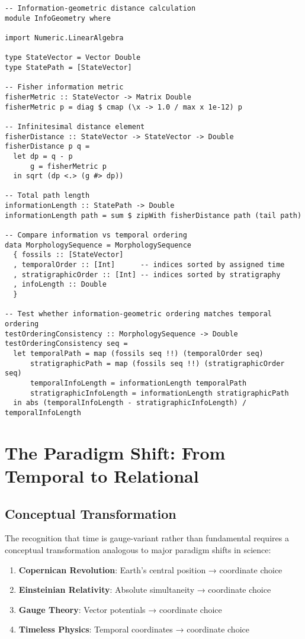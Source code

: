 \documentclass[11pt]{article}
\theoremstyle{definition}
\theoremstyle{plain}
\theoremstyle{remark}
\begin{document}
\begin{lstlisting}
-- Information-geometric distance calculation
module InfoGeometry where

import Numeric.LinearAlgebra

type StateVector = Vector Double
type StatePath = [StateVector]

-- Fisher information metric
fisherMetric :: StateVector -> Matrix Double  
fisherMetric p = diag $ cmap (\x -> 1.0 / max x 1e-12) p

-- Infinitesimal distance element
fisherDistance :: StateVector -> StateVector -> Double
fisherDistance p q = 
  let dp = q - p
      g = fisherMetric p  
  in sqrt (dp <.> (g #> dp))

-- Total path length
informationLength :: StatePath -> Double
informationLength path = sum $ zipWith fisherDistance path (tail path)

-- Compare information vs temporal ordering
data MorphologySequence = MorphologySequence
  { fossils :: [StateVector]
  , temporalOrder :: [Int]      -- indices sorted by assigned time
  , stratigraphicOrder :: [Int] -- indices sorted by stratigraphy  
  , infoLength :: Double
  }

-- Test whether information-geometric ordering matches temporal ordering
testOrderingConsistency :: MorphologySequence -> Double
testOrderingConsistency seq =
  let temporalPath = map (fossils seq !!) (temporalOrder seq)
      stratigraphicPath = map (fossils seq !!) (stratigraphicOrder seq)
      temporalInfoLength = informationLength temporalPath
      stratigraphicInfoLength = informationLength stratigraphicPath
  in abs (temporalInfoLength - stratigraphicInfoLength) / temporalInfoLength
\end{lstlisting}

\section{The Paradigm Shift: From Temporal to Relational}

\subsection{Conceptual Transformation}

The recognition that time is gauge-variant rather than fundamental requires a conceptual transformation analogous to major paradigm shifts in science:

\begin{analogy}
\begin{enumerate}
\item \textbf{Copernican Revolution}: Earth's central position → coordinate choice
\item \textbf{Einsteinian Relativity}: Absolute simultaneity → coordinate choice  
\item \textbf{Gauge Theory}: Vector potentials → coordinate choice
\item \textbf{Timeless Physics}: Temporal coordinates → coordinate choice
\end{enumerate}
\end{analogy}
\end{document}
